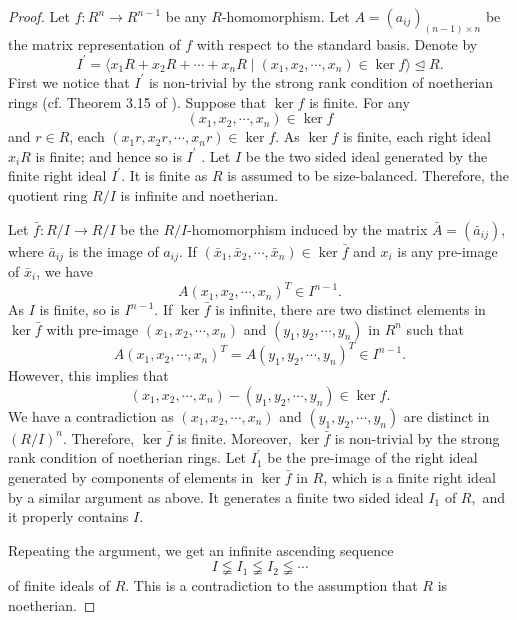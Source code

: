 \documentclass{gtpart}     %
\begin{document}
\begin{proof}
Let $f:R^{n}\rightarrow R^{n-1}$ be any $R$-homomorphism. Let $%
A=(a_{ij})_{(n-1)\times n}$ be the matrix representation of $f$ with respect
to the standard basis. Denote by
\begin{equation*}
I^{\prime }=\langle x_{1}R+x_{2}R+\cdots +x_{n}R\mid (x_{1},x_{2},\cdots
,x_{n})\in \ker f\rangle \unlhd R.
\end{equation*}%
First we notice that $I^{\prime }$ is non-trivial by the strong rank
condition of noetherian rings (cf. Theorem 3.15 of \cite{la}). Suppose that $%
\ker f$ is finite. For any
\begin{equation*}
(x_{1},x_{2},\cdots ,x_{n})\in \ker f
\end{equation*}
and $r\in R$, each $(x_{1}r,x_{2}r,\cdots ,x_{n}r)\in \ker f$. As $\ker f$
is finite, each right ideal $x_{i}R$ is finite; and hence so is $I^{\prime }$%
. Let $I$ be the two sided ideal generated by the finite right ideal $%
I^{\prime }$. It is finite as $R$ is assumed to be size-balanced. Therefore,
the quotient ring $R/I$ is infinite and noetherian.

Let $\bar{f}:R/I\rightarrow R/I$ be the $R/I$-homomorphism induced by the
matrix $\bar{A}=(\bar{a}_{ij}),$ where $\bar{a}_{ij}$ is the image of $%
a_{ij}.$ If $(\bar{x}_{1},\bar{x}_{2},\cdots ,\bar{x}_{n})\in \ker \bar{f}$
and $x_{i}$ is any pre-image of $\bar{x}_{i}$, we have%
\begin{equation*}
A(x_{1},x_{2},\cdots ,x_{n})^{T}\in I^{n-1}.
\end{equation*}%
As $I$ is finite, so is $I^{n-1}$. If $\ker \bar{f}$ is infinite, there are
two distinct elements in $\ker \bar{f}$ with pre-image $(x_{1},x_{2},\cdots
,x_{n})$ and $(y_{1},y_{2},\cdots ,y_{n})$ in $R^{n}$ such that%
\begin{equation*}
A(x_{1},x_{2},\cdots ,x_{n})^{T}=A(y_{1},y_{2},\cdots ,y_{n})^{T}\in I^{n-1}.
\end{equation*}%
However, this implies that
\begin{equation*}
(x_{1},x_{2},\cdots ,x_{n})-(y_{1},y_{2},\cdots ,y_{n})\in \ker f.
\end{equation*}%
We have a contradiction as $(x_{1},x_{2},\cdots ,x_{n})$ and $%
(y_{1},y_{2},\cdots ,y_{n})$ are distinct in $(R/I)^{n}$. Therefore, $\ker
\bar{f}$ is finite. Moreover, $\ker \bar{f}$ is non-trivial by the strong
rank condition of noetherian rings. Let $I_{1}^{\prime }$ be the pre-image
of the right ideal generated by components of elements in $\ker \bar{f}$ in $%
R$, which is a finite right ideal by a similar argument as above. It
generates a finite two sided ideal $I_{1}$ of $R,$ and it properly contains $%
I.$

Repeating the argument, we get an infinite ascending sequence
\begin{equation*}
I\lneqq I_{1}\lneqq I_{2}\lneqq \cdots
\end{equation*}
of finite ideals of $R$. This is a contradiction to the assumption that $R$
is noetherian.
\end{proof}
\end{document}
